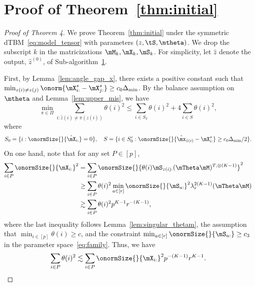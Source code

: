 \documentclass[lettersize,onecolumn,journal]{IEEEtran}
\theoremstyle{definition}
\theoremstyle{definition}
\begin{document}
\section*{Proof of Theorem~\ref{thm:initial}}
\begin{proof}[Proof of Theorem 4] We prove Theorem~\ref{thm:initial} under the symmetric dTBM~\eqref{eq:model_tensor} with parameters $(z, \tS, \mtheta)$. We drop the subscript $k$ in the matricizations $\mM_k, \mX_k, \mS_k$. For simplicity, let $\hat z$ denote the output, $\hat z^{(0)}$, of Sub-algorithm~\hyperref[alg:main]{1}.

First, by Lemma~\ref{lem:angle_gap_x}, there exists a positive constant such that $\min_{z(i) \neq z(j)} \onorm{ \mX^s_{i:} - \mX^s_{j:} } \geq c_0  \Delta_{\min}$. By the balance assumption on $\mtheta$ and Lemma~\ref{lem:upper_mis}, we have 
 \begin{equation}\label{eq:theta_bound}
          \min_{\pi \in \Pi} \sum_{i : \hat z(i) \neq \pi(z(i))} \theta(i)^2  \leq  \sum_{i \in S_I} \theta(i)^2 + 4 \sum_{i \in S} \theta(i)^2 ,
    \end{equation}
    where 
    \begin{equation}
        S_0 = \{i: \onormSize{}{\hat \mX_{i:}} = 0\}, \quad S = \{i \in S_0^c: \onormSize{}{\hat \mx_{\hat z(i)} - \mX_{i:}^s } \geq c_0  \Delta_{\min}/2\}.
    \end{equation}
    On one hand, note that for any set $P \in [p]$,
    \begin{align}
        \sum_{i \in P} \onormSize{}{\mX_{i:}}^2 &= \sum_{i \in P} \onormSize{}{ \theta(i) \mS_{z(i):} (\mTheta \mM)^{T, \otimes (K-1)} }^2 \\
        & \geq \sum_{i \in P} \theta(i)^2 \min_{a \in [r]} \onormSize{}{\mS_{a:}}^2 \lambda_{r}^{2(K-1)} (\mTheta \mM)\\
        & \gtrsim \sum_{i \in P} \theta(i)^2 p^{K-1} r^{-(K-1)}, 
    \end{align}
    where the last inequality follows Lemma~\ref{lem:singular_thetam}, the assumption that $\min_{i \in [p]} \theta(i) \geq c$, and the constraint $\min_{a \in [r]} \onormSize{}{\mS_{a:}} \geq c_3$ in the parameter space~\eqref{eq:family}. Thus, we have 
    \begin{equation}\label{eq:theta_p}
        \sum_{i \in P} \theta(i)^2 \lesssim \sum_{i \in P} \onormSize{}{\mX_{i:}}^2 p^{-(K-1)} r^{K-1}.
    \end{equation}


\end{proof}
\end{document}
